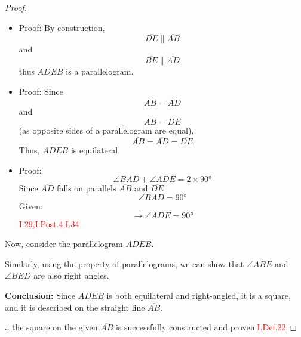 \begin{proof}%

\begin{lemma}
\begin{itemize}
$ADEB$ is a parallelogram.
\item Proof: By construction, 
\[\overline{DE} \parallel \overline{AB}\] 
and 
\[\overline{BE} \parallel  \overline{AD}\] 
thus $ADEB$ is a parallelogram.
\end{itemize}
\end{lemma}

\begin{lemma}
\begin{itemize}
$ADEB$ is equilateral.
\item Proof: Since 
\[\overline{AB} = \overline{AD}\]
 and 
 \[\overline{AB} = \overline{DE}\] 
 (as opposite sides of a parallelogram are equal), 
 \[\overline{AB} = \overline{AD} = \overline{DE}\]
 Thus, $ADEB$ is equilateral.
 \end{itemize}
 \end{lemma}

\begin{lemma}
\begin{itemize}
$ADEB$ is right-angled.
\item Proof: 
\[\angle{BAD} + \angle{ADE} =2\times\ang{90} \]
Since $\overline{AD}$ falls on parallels $\overline{AB}$ and $\overline{DE}$
    \[\angle{BAD} = \ang{90}\]
    Given:
    \[\rightarrow \angle{ADE} = \ang{90}\]\hfill\textcolor{red}{I.29,I.Post.4,I.34}
    \end{itemize}
\end{lemma}

Now, consider the parallelogram $ADEB$.

Similarly, using the property of parallelograms, we can show that $\angle{ABE}$ and $\angle{BED}$ are also right angles.

\textbf{Conclusion:} Since $ADEB$ is both equilateral and right-angled, it is a square, and it is described on the straight line $\overline{AB}$.


$\therefore$ the square on the given $\overline{AB}$ is successfully constructed and proven.\hfill\textcolor{red}{I.Def.22}

\end{proof}

\clearpage
